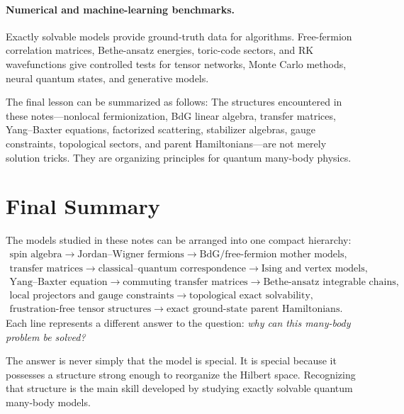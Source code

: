 \paragraph{Numerical and machine-learning benchmarks.}
Exactly solvable models provide ground-truth data for algorithms.  Free-fermion correlation matrices, Bethe-ansatz energies, toric-code sectors, and RK wavefunctions give controlled tests for tensor networks, Monte Carlo methods, neural quantum states, and generative models.

The final lesson can be summarized as follows:
The structures encountered in these notes---nonlocal fermionization, BdG linear algebra, transfer matrices, Yang--Baxter equations, factorized scattering, stabilizer algebras, gauge constraints, topological sectors, and parent Hamiltonians---are not merely solution tricks.  They are organizing principles for quantum many-body physics.

\section*{Final Summary}

The models studied in these notes can be arranged into one compact hierarchy:
\begin{equation}
\label{eq:conclusion-final-hierarchy}
\begin{gathered}
\text{spin algebra}
\longrightarrow
\text{Jordan--Wigner fermions}
\longrightarrow
\text{BdG/free-fermion mother models},
\\[3pt]
\text{transfer matrices}
\longrightarrow
\text{classical--quantum correspondence}
\longrightarrow
\text{Ising and vertex models},
\\[3pt]
\text{Yang--Baxter equation}
\longrightarrow
\text{commuting transfer matrices}
\longrightarrow
\text{Bethe-ansatz integrable chains},
\\[3pt]
\text{local projectors and gauge constraints}
\longrightarrow
\text{topological exact solvability},
\\[3pt]
\text{frustration-free tensor structures}
\longrightarrow
\text{exact ground-state parent Hamiltonians}.
\end{gathered}
\end{equation}
Each line represents a different answer to the question: \emph{why can this many-body problem be solved?}

The answer is never simply that the model is special.  It is special because it possesses a structure strong enough to reorganize the Hilbert space.  Recognizing that structure is the main skill developed by studying exactly solvable quantum many-body models.
